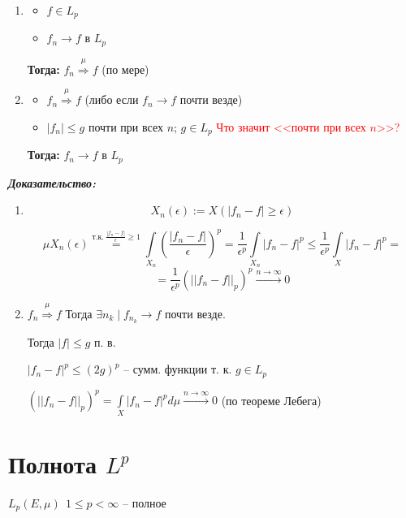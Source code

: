 \documentclass[paper=a4, fontsize=17pt]{article}
\begin{document}
\begin{enumerate}


	\item \begin{itemize}
		\item $ f \in L_p $
		\item $ f_n \rightarrow f $ в $ L_p $
	\end{itemize}
	\textbf{Тогда:} $ f_n \stackrel{\mu}{\Rightarrow} f $ (по мере)

	\item \begin{itemize}
		\item $ f_n \stackrel{\mu}{\Rightarrow} f $ (либо если $ f_n \rightarrow f $  почти везде)
		\item $ |f_n| \leq g $ почти при всех $n$; $g \in L_p$ \textcolor{red}{Что значит <<почти при всех $n$>>?}
	\end{itemize}
	\textbf{Тогда:} $ f_n \rightarrow f $ в $ L_p $
\end{enumerate}

\textbf{\emph{Доказательство:}}

\begin{enumerate}
	\item $$ X_n(\epsilon) := X(|f_n - f| \geq \epsilon) $$

	$$ \mu X_n(\epsilon) \overset{\text{т.к.}\ \frac{|f_n-f|}{\epsilon} \geq 1}{=} \int\limits_{X_n} (\frac{|f_n - f|}{\epsilon})^p  =
	\frac{1}{\epsilon^p} \int\limits_{X_n} |f_n - f|^p \leq
	\frac{1}{\epsilon^p} \int\limits_{X} |f_n - f|^p = $$
	$$ = \frac{1}{\epsilon^p} (||f_n - f||_p)^p \stackrel{n \rightarrow \infty}{\rightarrow} 0$$

	\item $ f_n \stackrel{\mu}{\Rightarrow} f $ Тогда $ \exists n_k \mid f_{n_k} \rightarrow f $ почти везде.

	Тогда $ |f| \leq g $ п. в.

	$ |f_n - f|^p \leq (2g)^p $ -- сумм. функции т. к. $ g \in L_p $

	$ (||f_n - f||_p)^p = \int\limits_{X} |f_n - f|^p d\mu \stackrel{n \rightarrow \infty}{\rightarrow} 0 $ (по теореме Лебега)

\end{enumerate}

\section{Полнота $L^p$}
$ L_p(E, \mu) ~ ~ 1 \leq p < \infty $ -- полное
\end{document}

